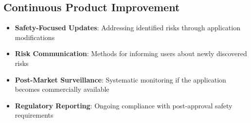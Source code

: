 \subsection{Continuous Product Improvement}
\begin{itemize}
    \item \textbf{Safety-Focused Updates}: Addressing identified risks through application modifications
    
    \item \textbf{Risk Communication}: Methods for informing users about newly discovered risks
    
    \item \textbf{Post-Market Surveillance}: Systematic monitoring if the application becomes commercially available
    
    \item \textbf{Regulatory Reporting}: Ongoing compliance with post-approval safety requirements
\end{itemize}